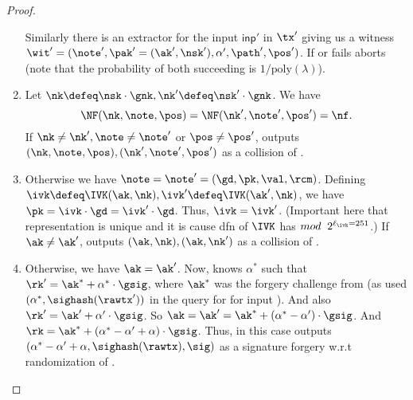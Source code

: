 \documentclass[11pt]{article}
\numberwithin{equation}{section} %
\numberwithin{figure}{section} %
\newcommand{\inp}{\ensuremath{\mathsf{inp}}\xspace}
\newcommand{\poly}{\ensuremath{\mathrm{poly}(\lambda)}\xspace}
\begin{document}
\begin{proof}
\begin{enumerate}[resume]
 Similarly there is an extractor \primeof{\ext} for the input $\inp'$ in $\tx'$ giving us a witness $\wit'=(\note',\pak'=(\ak',\nsk'),\alpha',\path',\pos')$. If \ext or \primeof{\ext} fails \advprime aborts (note that the probability of both succeeding is $1/\poly$).
\item Let $\nk\defeq \nsk\cdot \gnk, \nk'\defeq \nsk'\cdot \gnk$.  We have \[\NF(\nk,\note,\pos) = \NF(\nk',\note',\pos')=\nf.\]
If $\nk\neq\nk',\note\neq\note'$ or $\pos\neq \pos'$, \advprime outputs $(\nk,\note,\pos), (\nk',\note',\pos')$ as a collision of \NF.

\item Otherwise we have $\note=\note'=(\gd,\pk,\val,\rcm)$.
Defining
$\ivk\defeq \IVK(\ak,\nk), \ivk'\defeq \IVK(\ak',\nk)$,
we have $\pk= \ivk\cdot \gd = \ivk'\cdot \gd$. 
Thus, $\ivk=\ivk'$.
(Important here that \ivk representation is unique and it is cause dfn of $\IVK$ has $mod\;\; 2^{\ell_{\ivk}=251}$.)
If $\ak\neq \ak'$, \advprime outputs $(\ak,\nk),(\ak,\nk')$ as a collision of \IVK.

\item Otherwise, we have $\ak=\ak'$.
 Now, \advprime knows $\alpha^*$ such that $\rk' = \ak^* + \alpha^*\cdot \gsig$, where $\ak^*$ was the forgery challenge from \oracle (as \adv used $(\alpha^*,\sighash(\rawtx'))$ in the \signallinputs query for \primeof{\tx} for input \primeof{\inp}).
And also $\rk' = \ak' + \alpha'\cdot \gsig$.
So $\ak=\ak'= \ak^* + (\alpha^*-\alpha')\cdot\gsig$.
And $\rk = \ak^* +(\alpha^*-\alpha'+\alpha)\cdot \gsig$.
Thus, in this case \advprime outputs $(\alpha^*-\alpha'+\alpha, \sighash(\rawtx), \sig )$ as a signature forgery w.r.t randomization of \akstar.
 
\end{enumerate}

\end{proof}
\newcommand{\tree}{\ensuremath{\mathsf{T}}\xspace}
\newcommand{\curnotes}{\ensuremath{\mathsf{N}}\xspace}
\end{document}
